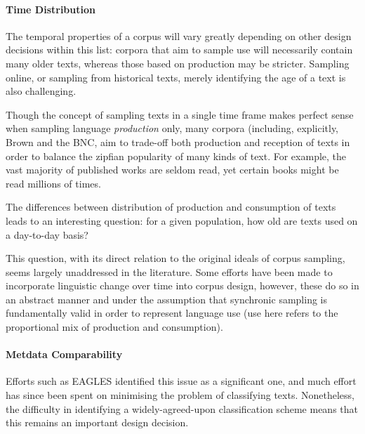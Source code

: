 \paragraph{Time Distribution}
The temporal properties of a corpus will vary greatly depending on other design decisions within this list: corpora that aim to sample use will necessarily contain many older texts, whereas those based on production may be stricter.
Sampling online, or sampling from historical texts, merely identifying the age of a text is also challenging.

Though the concept of sampling texts in a single time frame makes perfect sense when sampling language \textit{production} only, many corpora (including, explicitly, Brown and the BNC, aim to trade-off both production and reception of texts in order to balance the zipfian popularity of many kinds of text.  For example, the vast majority of published works are seldom read, yet certain books might be read millions of times.

The differences between distribution of production and consumption of texts leads to an interesting question: for a given population, how old are texts used on a day-to-day basis?

This question, with its direct relation to the original ideals of corpus sampling, seems largely unaddressed in the literature. Some efforts have been made to incorporate linguistic change over time into corpus design, however, these do so in an abstract manner and under the assumption that synchronic sampling is fundamentally valid in order to represent language use (use here refers to the proportional mix of production and consumption).







\paragraph{Metdata Comparability}
Efforts such as EAGLES identified this issue as a significant one, and much effort has since been spent on minimising the problem of classifying texts.  Nonetheless, the difficulty in identifying a widely-agreed-upon classification scheme means that this remains an important design decision.

